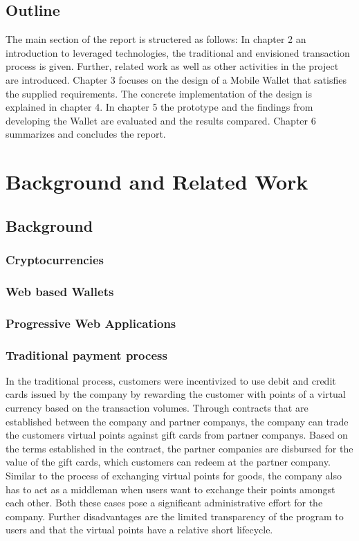 \documentclass[a4paper]{article}
\begin{document}
\subsection{Outline}
The main section of the report is structered as follows:
In chapter 2 an introduction to leveraged technologies, the traditional and envisioned transaction process is given. Further, related work  as well as other activities in the project are introduced. Chapter 3 focuses on the design of a Mobile Wallet that satisfies the supplied requirements. The concrete implementation of the design is explained in chapter 4. In chapter 5 the prototype and the findings from developing the Wallet are evaluated and the results compared.
Chapter 6 summarizes and concludes the report.
\newpage

\section{Background and Related Work}
\subsection{Background}
\subsubsection{Cryptocurrencies}
\subsubsection{Web based Wallets}
\subsubsection{Progressive Web Applications}
\subsubsection{Traditional payment process}
In the traditional process, customers were incentivized to use debit and credit cards issued by the company by rewarding the customer with points of a virtual currency based on the transaction volumes.
Through contracts that are established between the company and partner companys, the company can trade the customers virtual points against gift cards from partner companys.
Based on the terms established in the contract, the partner companies are disbursed for the value of the gift cards, which customers can redeem at the partner company.
Similar to the process of exchanging virtual points for goods, the company also has to act as a middleman when users want to exchange their points amongst each other. Both these cases pose a significant administrative effort for the company. Further disadvantages are the limited transparency of the program to users and that the virtual points have a relative short lifecycle.
\end{document}
